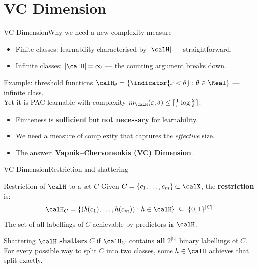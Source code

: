 \section{VC Dimension}

\begin{frame}{VC Dimension}{Why we need a new complexity measure}
  \begin{itemize}
    \item Finite classes: learnability characterised by $|\calH|$ — straightforward.
    \item Infinite classes: $|\calH| = \infty$ — the counting argument breaks down.
  \end{itemize}
  \bigskip
  \begin{exampleblock}{Example: threshold functions}
    $\calH_\theta = \{\indicator{x < \theta} : \theta \in \Real\}$ — infinite class.\\[4pt]
    Yet it is PAC learnable with complexity
    $m_\calH(\varepsilon,\delta) \leq \lceil\frac{1}{\varepsilon}\log\frac{2}{\delta}\rceil$.
  \end{exampleblock}
  \bigskip
  \begin{itemize}
    \item Finiteness is \textbf{sufficient} but \textbf{not necessary} for learnability.
    \item We need a measure of complexity that captures the \emph{effective} size.
    \item The answer: \textcolor{AccentBlue}{\textbf{Vapnik–Chervonenkis (VC) Dimension}}.
  \end{itemize}
\end{frame}

\begin{frame}{VC Dimension}{Restriction and shattering}
  \begin{block}{Restriction of $\calH$ to a set $C$}
    Given $C = \{c_1,\ldots,c_m\} \subset \calX$, the \textbf{restriction} is:
    \[
      \calH_C = \{(h(c_1),\ldots,h(c_m)) : h \in \calH\}
        \;\subseteq\; \{0,1\}^{|C|}
    \]
    The set of all labellings of $C$ achievable by predictors in $\calH$.
  \end{block}
  \bigskip
  \begin{block}{Shattering}
    $\calH$ \textcolor{AccentBlue}{\textbf{shatters}} $C$ if $\calH_C$ contains
    \textbf{all} $2^{|C|}$ binary labellings of $C$.\\[4pt]
    For every possible way to split $C$ into two classes, some $h\in\calH$ achieves that
    split exactly.
  \end{block}
\end{frame}

